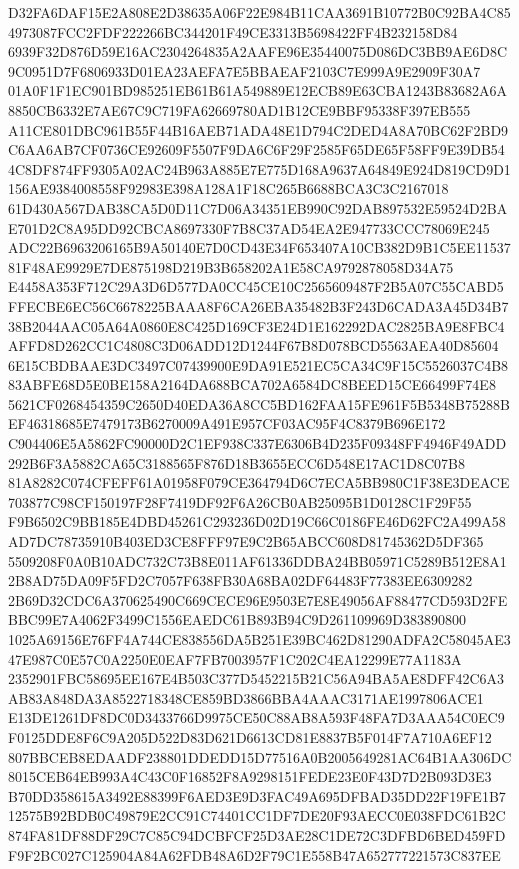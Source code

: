 \documentclass[UTF8,fontset=fandol,zihao=-4,a4paper]{ctexart}
\begin{document}
{{D32FA6DAF15E2A808E2D38635A06F22E984B11CAA3691B10772B0C92BA4C854973087FCC2FDF222266BC344201F49CE3313B5698422FF4B232158D84
6939F32D876D59E16AC2304264835A2AAFE96E35440075D086DC3BB9AE6D8C9C0951D7F6806933D01EA23AEFA7E5BBAEAF2103C7E999A9E2909F30A7
01A0F1F1EC901BD985251EB61B61A549889E12ECB89E63CBA1243B83682A6A8850CB6332E7AE67C9C719FA62669780AD1B12CE9BBF95338F397EB555
A11CE801DBC961B55F44B16AEB71ADA48E1D794C2DED4A8A70BC62F2BD9C6AA6AB7CF0736CE92609F5507F9DA6C6F29F2585F65DE65F58FF9E39DB54
4C8DF874FF9305A02AC24B963A885E7E775D168A9637A64849E924D819CD9D1156AE9384008558F92983E398A128A1F18C265B6688BCA3C3C2167018
61D430A567DAB38CA5D0D11C7D06A34351EB990C92DAB897532E59524D2BAE701D2C8A95DD92CBCA8697330F7B8C37AD54EA2E947733CCC78069E245
ADC22B6963206165B9A50140E7D0CD43E34F653407A10CB382D9B1C5EE1153781F48AE9929E7DE875198D219B3B658202A1E58CA9792878058D34A75
E4458A353F712C29A3D6D577DA0CC45CE10C2565609487F2B5A07C55CABD5FFECBE6EC56C6678225BAAA8F6CA26EBA35482B3F243D6CADA3A45D34B7
38B2044AAC05A64A0860E8C425D169CF3E24D1E162292DAC2825BA9E8FBC4AFFD8D262CC1C4808C3D06ADD12D1244F67B8D078BCD5563AEA40D85604
6E15CBDBAAE3DC3497C07439900E9DA91E521EC5CA34C9F15C5526037C4B883ABFE68D5E0BE158A2164DA688BCA702A6584DC8BEED15CE66499F74E8
5621CF0268454359C2650D40EDA36A8CC5BD162FAA15FE961F5B5348B75288BEF46318685E7479173B6270009A491E957CF03AC95F4C8379B696E172
C904406E5A5862FC90000D2C1EF938C337E6306B4D235F09348FF4946F49ADD292B6F3A5882CA65C3188565F876D18B3655ECC6D548E17AC1D8C07B8
81A8282C074CFEFF61A01958F079CE364794D6C7ECA5BB980C1F38E3DEACE703877C98CF150197F28F7419DF92F6A26CB0AB25095B1D0128C1F29F55
F9B6502C9BB185E4DBD45261C293236D02D19C66C0186FE46D62FC2A499A58AD7DC78735910B403ED3CE8FFF97E9C2B65ABCC608D81745362D5DF365
5509208F0A0B10ADC732C73B8E011AF61336DDBA24BB05971C5289B512E8A12B8AD75DA09F5FD2C7057F638FB30A68BA02DF64483F77383EE6309282
2B69D32CDC6A370625490C669CECE96E9503E7E8E49056AF88477CD593D2FEBBC99E7A4062F3499C1556EAEDC61B893B94C9D261109969D383890800
1025A69156E76FF4A744CE838556DA5B251E39BC462D81290ADFA2C58045AE347E987C0E57C0A2250E0EAF7FB7003957F1C202C4EA12299E77A1183A
2352901FBC58695EE167E4B503C377D5452215B21C56A94BA5AE8DFF42C6A3AB83A848DA3A8522718348CE859BD3866BBA4AAAC3171AE1997806ACE1
E13DE1261DF8DC0D3433766D9975CE50C88AB8A593F48FA7D3AAA54C0EC9F0125DDE8F6C9A205D522D83D621D6613CD81E8837B5F014F7A710A6EF12
807BBCEB8EDAADF238801DDEDD15D77516A0B2005649281AC64B1AA306DC8015CEB64EB993A4C43C0F16852F8A9298151FEDE23E0F43D7D2B093D3E3
B70DD358615A3492E88399F6AED3E9D3FAC49A695DFBAD35DD22F19FE1B712575B92BDB0C49879E2CC91C74401CC1DF7DE20F93AECC0E038FDC61B2C
874FA81DF88DF29C7C85C94DCBFCF25D3AE28C1DE72C3DFBD6BED459FDF9F2BC027C125904A84A62FDB48A6D2F79C1E558B47A652777221573C837EE
}}
\end{document}
